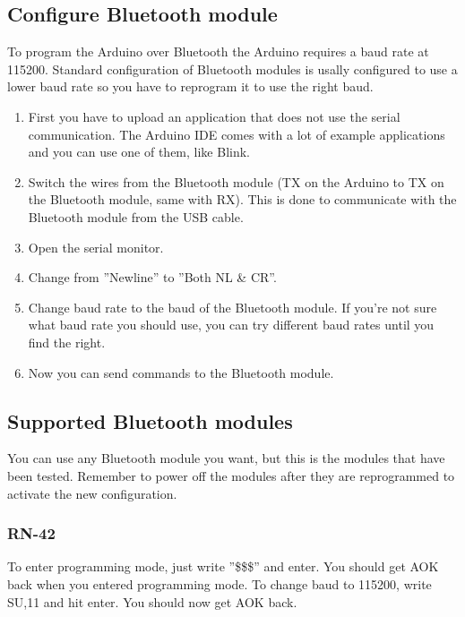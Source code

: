 		
		
		\subsection{Configure Bluetooth module}
		To program the Arduino over Bluetooth the Arduino requires a baud rate at 115200. Standard configuration of Bluetooth modules is usally configured to use a lower baud rate so you have to reprogram it to use the right baud.\\
		
		\begin{enumerate}
		\item First you have to upload an application that does not use the serial communication. The Arduino IDE comes with a lot of example applications and you can use one of them, like Blink.
		
		\item Switch the wires from the Bluetooth module (TX on the Arduino to TX on the Bluetooth module, same with RX). This is done to communicate with the Bluetooth module from the USB cable.
		
		\item Open the serial monitor.
		
		\item Change from ''Newline'' to ''Both NL \& CR''.
		
		\item Change baud rate to the baud of the Bluetooth module. If you're not sure what baud rate you should use, you can try different baud rates until you find the right.
		
		\item Now you can send commands to the Bluetooth module.
		\end{enumerate}

			\subsection{Supported Bluetooth modules}
			You can use any Bluetooth module you want, but this is the modules that have been tested. Remember to power off the modules after they are reprogrammed to activate the new configuration.
			
				\subsubsection{RN-42}
				To enter programming mode, just write ''\$\$\$'' and enter. You should get AOK back when you entered programming mode. To change baud to 115200, write SU,11 and hit enter. You should now get AOK back.\\
				

